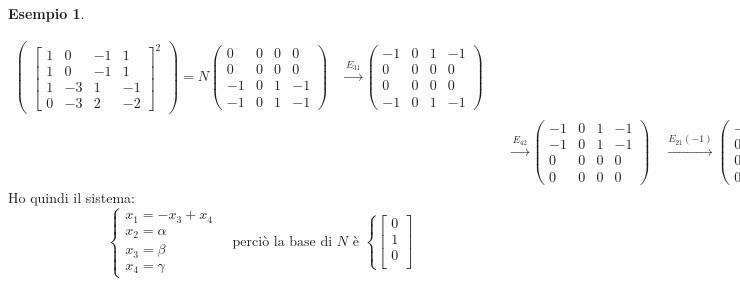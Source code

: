 \documentclass[a4paper]{article}
\theoremstyle{definition}
\newtheorem{exmp}{Esempio}[section]
\begin{document}
\begin{exmp}
\begin{enumerate}
\begin{align*}
\begin{pmatrix}
							\begin{bmatrix}
								1 & 0 & -1 & 1 \\
								1 & 0 & -1 & 1 \\
								1 & -3 & 1 & -1 \\
								0 & -3 & 2 & -2
							\end{bmatrix}^2
						\end{pmatrix}
						= N
						\begin{pmatrix}
							0 & 0 & 0 & 0 \\
							0 & 0 & 0 & 0 \\
							-1 & 0 & 1 & -1 \\
							-1 & 0 & 1 & -1
						\end{pmatrix}
						\quad\xrightarrow{E_{3 1}}
						\begin{pmatrix}
							-1 & 0 & 1 & -1 \\
							0 & 0 & 0 & 0 \\
							0 & 0 & 0 & 0 \\
							-1 & 0 & 1 & -1
						\end{pmatrix} \\
						&\quad\xrightarrow{E_{4 2}}
						\begin{pmatrix}
							-1 & 0 & 1 & -1 \\
							-1 & 0 & 1 & -1\\
							0 & 0 & 0 & 0 \\
							0 & 0 & 0 & 0 
						\end{pmatrix} 
						\quad\xrightarrow{E_{2 1}(-1)}
						\begin{pmatrix}
							-1 & 0 & 1 & -1 \\
							0 & 0 & 0 & 0\\
							0 & 0 & 0 & 0 \\
							0 & 0 & 0 & 0 
						\end{pmatrix}
					\end{align*}
					Ho quindi il sistema:
					\[
						\begin{cases}
							x_1 = -x_3 + x_4 \\
							x_2 = \alpha \\
							x_3 = \beta \\
							x_4 = \gamma
						\end{cases}
						\quad
						\text{perciò la base di } N \text{ è }
						\left\{
						\begin{bmatrix}
							0\\
							1\\
							0\\

\end{bmatrix}\]
\end{enumerate}
\end{exmp}
\end{document}
